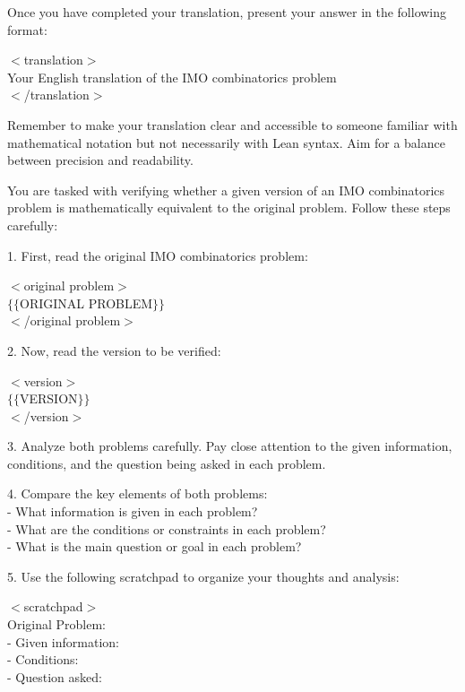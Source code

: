 \begin{tcolorbox}
Once you have completed your translation, present your answer in the following format:

$<$translation$>$ \\ 
Your English translation of the IMO combinatorics problem \\
$<$/translation$>$

Remember to make your translation clear and accessible to someone familiar with mathematical notation but not necessarily with Lean syntax. Aim for a balance between precision and readability.

\end{tcolorbox}


\begin{tcolorbox}[enhanced, breakable, rounded corners, 
    colback=brown!5!white, colframe=brown!75!black,
    colbacktitle=brown!85!black, fonttitle=\bfseries, coltitle=white,
    title= Cycle Comparison Prompt Between Original Problem in English and Backtranslated Problem in English]
\setlength{\parskip}{1em}
You are tasked with verifying whether a given version of an IMO combinatorics problem is mathematically equivalent to the original problem. Follow these steps carefully:

1. First, read the original IMO combinatorics problem:

$<$original problem$>$ \\
$\{\{$ORIGINAL PROBLEM$\}\}$ \\
$<$/original problem$>$

2. Now, read the version to be verified:

$<$version$>$ \\
$\{\{$VERSION$\}\}$ \\
$<$/version$>$

3. Analyze both problems carefully. Pay close attention to the given information, conditions, and the question being asked in each problem.

4. Compare the key elements of both problems: \\
   - What information is given in each problem? \\
   - What are the conditions or constraints in each problem? \\
   - What is the main question or goal in each problem?

5. Use the following scratchpad to organize your thoughts and analysis:

$<$scratchpad$>$\\
Original Problem: \\
- Given information: \\
- Conditions: \\
- Question asked:


\end{tcolorbox}
